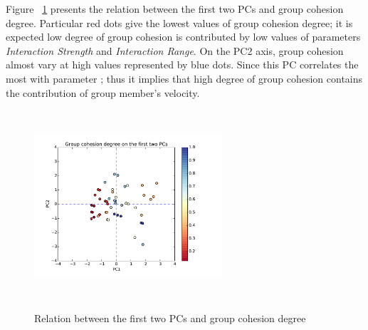 \documentclass[a4paper,11pt,phdthesis,singlespace,twoside]{cssethesis}
\begin{document}
Figure ~\ref{fig:pca_lanscape_group_cohesion} presents the relation between the first two PCs and group cohesion degree. Particular red dots give the lowest values of group cohesion degree; it is expected low degree of group cohesion is contributed by low values of parameters \textit{Interaction Strength} and \textit{Interaction Range}. On the PC2 axis, group cohesion almost vary at high values represented by blue dots. Since this PC correlates the most with parameter ; thus it implies that high degree of group cohesion contains the contribution of group member's velocity.
\begin{figure}[H]
\begin{center}
{\includegraphics[width=7cm,height=7cm]{figs/pca_lanscape_group_cohesion.pdf}}
\end{center}
\caption{Relation between the first two PCs and group cohesion degree}
\label{fig:pca_lanscape_group_cohesion}
\end{figure}
\end{document}
